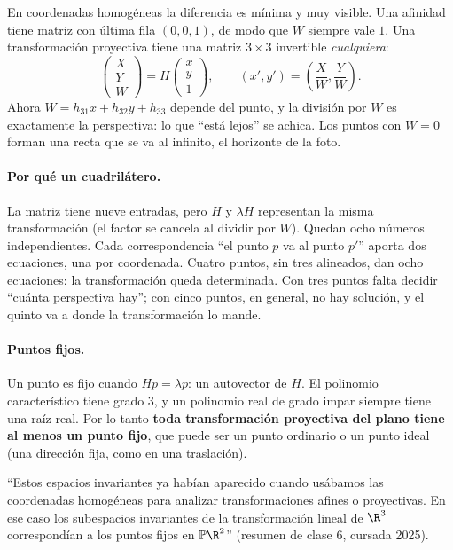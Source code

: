 En coordenadas homogéneas la diferencia es mínima y muy visible. Una afinidad tiene matriz
con última fila \((0,0,1)\), de modo que \(W\) siempre vale \(1\). Una transformación
proyectiva tiene una matriz \(3\times3\) invertible \emph{cualquiera}:
\[
\begin{pmatrix}X\\Y\\W\end{pmatrix}=H\begin{pmatrix}x\\y\\1\end{pmatrix},
\qquad
(x',y')=\left(\frac{X}{W},\frac{Y}{W}\right).
\]
Ahora \(W=h_{31}x+h_{32}y+h_{33}\) depende del punto, y la división por \(W\) es
exactamente la perspectiva: lo que ``está lejos'' se achica. Los puntos con \(W=0\) forman
una recta que se va al infinito, el horizonte de la foto.

\paragraph{Por qué un cuadrilátero.}
La matriz tiene nueve entradas, pero \(H\) y \(\lambda H\) representan la misma
transformación (el factor se cancela al dividir por \(W\)). Quedan ocho números
independientes. Cada correspondencia ``el punto \(p\) va al punto \(p'\)'' aporta dos
ecuaciones, una por coordenada. Cuatro puntos, sin tres alineados, dan ocho ecuaciones: la
transformación queda determinada. Con tres puntos falta decidir ``cuánta perspectiva hay'';
con cinco puntos, en general, no hay solución, y el quinto va a donde la transformación lo
mande.

\paragraph{Puntos fijos.}
Un punto es fijo cuando \(Hp=\lambda p\): un autovector de \(H\). El polinomio característico
tiene grado \(3\), y un polinomio real de grado impar siempre tiene una raíz real. Por lo tanto
\textbf{toda transformación proyectiva del plano tiene al menos un punto fijo}, que puede ser
un punto ordinario o un punto ideal (una dirección fija, como en una traslación).

\begin{idea}
``Estos espacios invariantes ya habían aparecido cuando usábamos las coordenadas
homogéneas para analizar transformaciones afines o proyectivas. En ese caso los subespacios
invariantes de la transformación lineal de \(\R^3\) correspondían a los puntos fijos en
\(\mathbb{P}\R^2\)'' (resumen de clase 6, cursada 2025).
\end{idea}

